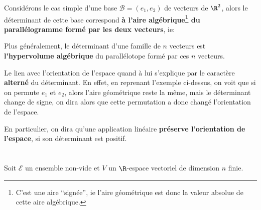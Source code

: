 Considérons le cas simple d'une base \(\mathscr{B} = (e_1, e_2)\) de vecteurs de \(\R^2\), alors le déterminant de cette base correspond \textbf{à l'aire algébrique\footnote[2]{C'est une aire ``signée'', ie l'aire géométrique est donc la valeur absolue de cette aire algébrique.} du parallélogramme formé par les deux vecteurs}, ie:
\begin{center}
\end{center}
Plus généralement, le déterminant d'une famille de \(n\) vecteurs est \textbf{l'hypervolume algébrique} du parallélotope formé par ces \(n\) vecteurs.\<

Le lien avec l'orientation de l'espace quand à lui s'explique par le caractère \textbf{alterné} du déterminant.\+
En effet, en reprenant l'exemple ci-dessus, on voit que si on permute \(e_1\) et \(e_2\), alors l'aire géométrique reste la même, mais le déterminant change de signe, on dira alors que cette permutation a donc changé l'orientation de l'espace.\<

En particulier, on dira qu'une application linéaire \textbf{préserve l'orientation de l'espace}, si son déterminant est positif.

\chapter*{} %
Soit \(\mathscr{E}\) un ensemble non-vide et \(V\) un \(\R\)-espace vectoriel de dimension \(n\) finie.
